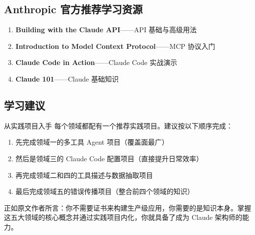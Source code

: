 \documentclass[a4paper]{article}
\begin{document}
\subsection{Anthropic 官方推荐学习资源}

\begin{enumerate}[leftmargin=1.5em]
    \item \textbf{Building with the Claude API}——API 基础与高级用法
    \item \textbf{Introduction to Model Context Protocol}——MCP 协议入门
    \item \textbf{Claude Code in Action}——Claude Code 实战演示
    \item \textbf{Claude 101}——Claude 基础知识
\end{enumerate}

\subsection{学习建议}

\begin{importantbox}{从实践项目入手}
每个领域都配有一个推荐实践项目。建议按以下顺序完成：
\begin{enumerate}[leftmargin=1.5em]
    \item 先完成领域一的多工具 Agent 项目（覆盖面最广）
    \item 然后是领域三的 Claude Code 配置项目（直接提升日常效率）
    \item 再完成领域二和四的工具描述与数据抽取项目
    \item 最后完成领域五的错误传播项目（整合前四个领域的知识）
\end{enumerate}
\end{importantbox}

正如原文作者所言：你不需要证书来构建生产级应用，你需要的是知识本身。掌握这五大领域的核心概念并通过实践项目内化，你就具备了成为 Claude 架构师的能力。

\end{document}
